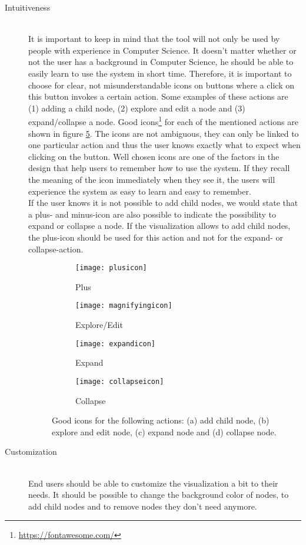 \begin{description}
	\item[Intuitiveness] \hfill \\
	It is important to keep in mind that the tool will not only be used by people with experience in Computer Science. It doesn't matter whether or not the user has a background in Computer Science, he should be able to easily learn to use the system in short time. Therefore, it is important to choose for clear, not misunderstandable icons on buttons where a click on this button invokes a certain action. Some examples of these actions are (1) adding a child node, (2) explore and edit a node and (3) expand/collapse a node. Good icons\footnote{\url{https://fontawesome.com/}} for each of the mentioned actions are shown in figure \ref{fig:icons}. The icons are not ambiguous, they can only be linked to one particular action and thus the user knows exactly what to expect when clicking on the button. Well chosen icons are one of the factors in the design that help users to remember how to use the system. If they recall the meaning of the icon immediately when they see it, the users will experience the system as easy to learn and easy to remember.\\
	
	If the user knows it is not possible to add child nodes, we would state that a plus- and minus-icon are also possible to indicate the possibility to expand or collapse a node. If the visualization allows to add child nodes, the plus-icon should be used for this action and not for the expand- or collapse-action.

\begin{figure}[H]
	\centering
	\begin{subfigure}{.2\textwidth}
  		\centering
  		\texttt{[image: plusicon]}
  		\caption{Plus}
  		\label{fig:plusicon}
	\end{subfigure}%
	\begin{subfigure}{.2\textwidth}
  		\centering
  		\texttt{[image: magnifyingicon]}
  		\caption{Explore/Edit}
  		\label{fig:editicon}
	\end{subfigure}
	\begin{subfigure}{.2\textwidth}
  		\centering
  		\texttt{[image: expandicon]}
  		\caption{Expand}
  		\label{fig:expandicon}
	\end{subfigure}
	\begin{subfigure}{.2\textwidth}
  		\centering
  		\texttt{[image: collapseicon]}
  		\caption{Collapse}
  		\label{fig:collapseicon}
	\end{subfigure}
	\caption{Good icons for the following actions: (a) add child node, (b) explore and edit node, (c) expand node and (d) collapse node.}
	\label{fig:icons}
\end{figure}

	\item[Customization] \hfill \\
	End users should be able to customize the visualization a bit to their needs. It should be possible to change the background color of nodes, to add child nodes and to remove nodes they don't need anymore.
	
\end{description}




